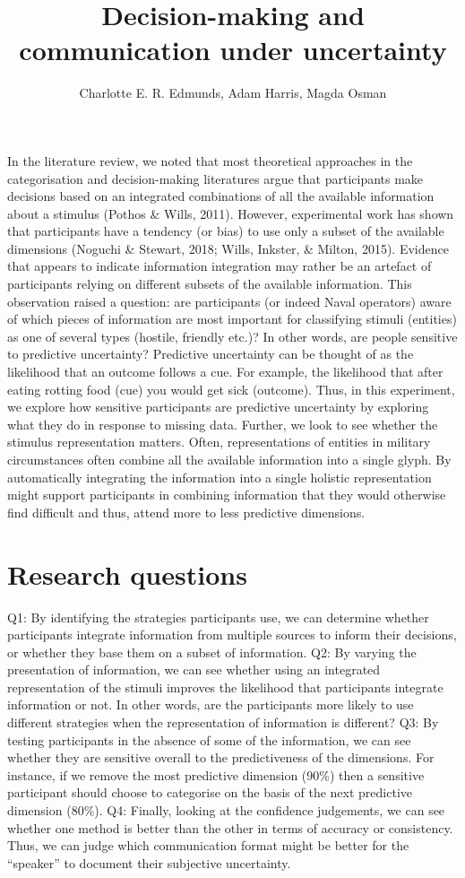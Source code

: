 \documentclass[doc, a4paper, apacite]{apa6}
\title{Decision-making and communication under uncertainty}
\author{Charlotte E. R. Edmunds, Adam Harris, Magda Osman}
\affiliation{Queen Mary, UCL, University of London \\ 11 January 2021}
\begin{document}
\maketitle
\doublespacing

In the literature review, we noted that most theoretical approaches in the categorisation and decision-making literatures argue that participants make decisions based on an integrated combinations of all the available information about a stimulus (Pothos \& Wills, 2011). However, experimental work has shown that participants have a tendency (or bias) to use only a subset of the available dimensions (Noguchi \& Stewart, 2018; Wills, Inkster, \& Milton, 2015). Evidence that appears to indicate information integration may rather be an artefact of participants relying on different subsets of the available information. This observation raised a question: are participants (or indeed Naval operators) aware of which pieces of information are most important for classifying stimuli (entities) as one of several types (hostile, friendly etc.)? In other words, are people sensitive to predictive uncertainty? Predictive uncertainty can be thought of as the likelihood that an outcome follows a cue. For example, the likelihood that after eating rotting food (cue) you would get sick (outcome). Thus, in this experiment, we explore how sensitive participants are predictive uncertainty by exploring what they do in response to missing data. 
Further, we look to see whether the stimulus representation matters. Often, representations of entities in military circumstances often combine all the available information into a single glyph. 
By automatically integrating the information into a single holistic representation might support participants in combining information that they would otherwise find difficult and thus, attend more to less predictive dimensions. 


\section{Research questions}
Q1: By identifying the strategies participants use, we can determine whether participants integrate information from multiple sources to inform their decisions, or whether they base them on a subset of information. 
Q2: By varying the presentation of information, we can see whether using an integrated representation of the stimuli improves the likelihood that participants integrate information or not. In other words, are the participants more likely to use different strategies when the representation of information is different?
Q3: By testing participants in the absence of some of the information, we can see whether they are sensitive overall to the predictiveness of the dimensions. For instance, if we remove the most predictive dimension (90\%) then a sensitive participant should choose to categorise on the basis of the next predictive dimension (80\%). 
Q4: Finally, looking at the confidence judgements, we can see whether one method is better than the other in terms of accuracy or consistency. Thus, we can judge which communication format might be better for the “speaker” to document their subjective uncertainty.   
\end{document}

